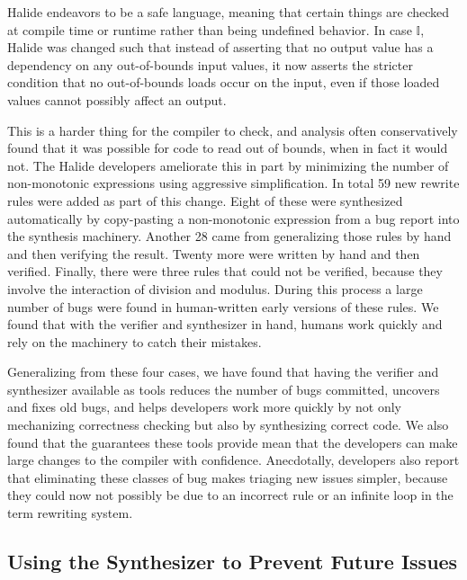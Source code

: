 \documentclass[acmsmall,review]{acmart}\settopmatter{printfolios=true,printccs=false,printacmref=false}
\begin{document}
Halide endeavors to be a safe language, meaning that certain things are checked at compile time or runtime rather than being undefined behavior. In case $\mathbb{I}$, Halide was changed such that instead of asserting that no output value has a dependency on any out-of-bounds input values, it now asserts the stricter condition that no out-of-bounds loads occur on the input, even if those loaded values cannot possibly affect an output.

This is a harder thing for the compiler to check, and analysis often conservatively found that it was possible for code to read out of bounds, when in fact it would not. The Halide developers ameliorate this in part by minimizing the number of non-monotonic expressions using aggressive simplification. In total 59 new rewrite rules were added as part of this change. Eight of these were synthesized automatically by copy-pasting a non-monotonic expression from a bug report into the synthesis machinery. Another 28 came from generalizing those rules by hand and then verifying the result. Twenty more were written by hand and then verified. Finally, there were three rules that could not be verified, because they involve the interaction of division and modulus. During this process a large number of bugs were found in human-written early versions of these rules. We found that with the verifier and synthesizer in hand, humans work quickly and rely on the machinery to catch their mistakes.

Generalizing from these four cases, we have found that having the verifier and synthesizer available as tools reduces the number of bugs committed, uncovers and fixes old bugs, and helps developers work more quickly by not only mechanizing correctness checking but also by synthesizing correct code. We also found that the guarantees these tools provide mean that the developers can make large changes to the compiler with confidence. Anecdotally, developers also report that eliminating these classes of bug makes triaging new issues simpler, because they could now not possibly be due to an incorrect rule or an infinite loop in the term rewriting system.

\subsection{Using the Synthesizer to Prevent Future Issues}
\label{ssec:compilationspeed}
\end{document}
